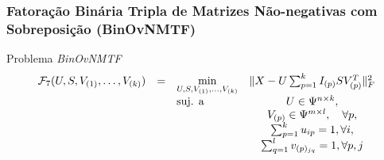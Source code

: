 \documentclass[10pt]{beamer}
\DeclareMathOperator*{\argmax}{arg\,max}
\DeclarePairedDelimiter\norm{\lVert}{\rVert}
\begin{document}





\begin{frame}
  \frametitle{Fatoração Binária Tripla de Matrizes Não-negativas com Sobreposição (BinOvNMTF)}

  \begin{block}{Problema \textit{BinOvNMTF}}
    \begin{equation}
        \begin{array}{lclc}
            \displaystyle \mathcal{F}_7(U, S, V_{(1)}, \dots, V_{(k)}) & = & \displaystyle \min_{U, S, V_{(1)}, \dots, V_{(k)}} & \norm{ X - U \sum_{p=1}^{k} I_{(p)} S V_{(p)}^T }^{2}_{F} \\
                                                                       &   & \text{suj. a}                & U \in \Psi^{n \times k}, \\
                                                                       &   &                              & V_{(p)} \in \Psi^{m \times l}, \quad \forall p, \\
                                                                       &   &                              & \sum_{p=1}^{k} u_{ip} = 1, \forall i, \\
                                                                       &   &                              & \sum_{q=1}^{l} v_{(p)_{jq}} = 1, \forall p, j
        \end{array}   \nonumber
    \end{equation}
  \end{block}

\end{frame}
\end{document}
